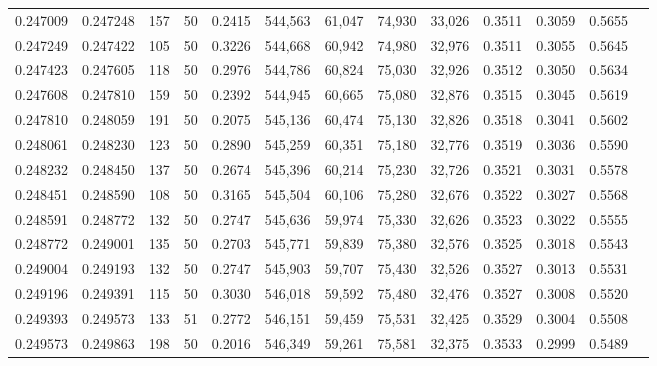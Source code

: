 \begin{tabular}{rrrrrrrrrrrrr}
0.247009 & 0.247248 &   157 &  50 &                                     0.2415 & 544,563 &  61,047 &  74,930 &  33,026 & 0.3511 & 0.3059 & 0.5655 \\
0.247249 & 0.247422 &   105 &  50 &                                     0.3226 & 544,668 &  60,942 &  74,980 &  32,976 & 0.3511 & 0.3055 & 0.5645 \\
0.247423 & 0.247605 &   118 &  50 &                                     0.2976 & 544,786 &  60,824 &  75,030 &  32,926 & 0.3512 & 0.3050 & 0.5634 \\
0.247608 & 0.247810 &   159 &  50 &                                     0.2392 & 544,945 &  60,665 &  75,080 &  32,876 & 0.3515 & 0.3045 & 0.5619 \\
0.247810 & 0.248059 &   191 &  50 &                                     0.2075 & 545,136 &  60,474 &  75,130 &  32,826 & 0.3518 & 0.3041 & 0.5602 \\
0.248061 & 0.248230 &   123 &  50 &                                     0.2890 & 545,259 &  60,351 &  75,180 &  32,776 & 0.3519 & 0.3036 & 0.5590 \\
0.248232 & 0.248450 &   137 &  50 &                                     0.2674 & 545,396 &  60,214 &  75,230 &  32,726 & 0.3521 & 0.3031 & 0.5578 \\
0.248451 & 0.248590 &   108 &  50 &                                     0.3165 & 545,504 &  60,106 &  75,280 &  32,676 & 0.3522 & 0.3027 & 0.5568 \\
0.248591 & 0.248772 &   132 &  50 &                                     0.2747 & 545,636 &  59,974 &  75,330 &  32,626 & 0.3523 & 0.3022 & 0.5555 \\
0.248772 & 0.249001 &   135 &  50 &                                     0.2703 & 545,771 &  59,839 &  75,380 &  32,576 & 0.3525 & 0.3018 & 0.5543 \\
0.249004 & 0.249193 &   132 &  50 &                                     0.2747 & 545,903 &  59,707 &  75,430 &  32,526 & 0.3527 & 0.3013 & 0.5531 \\
0.249196 & 0.249391 &   115 &  50 &                                     0.3030 & 546,018 &  59,592 &  75,480 &  32,476 & 0.3527 & 0.3008 & 0.5520 \\
0.249393 & 0.249573 &   133 &  51 &                                     0.2772 & 546,151 &  59,459 &  75,531 &  32,425 & 0.3529 & 0.3004 & 0.5508 \\
0.249573 & 0.249863 &   198 &  50 &                                     0.2016 & 546,349 &  59,261 &  75,581 &  32,375 & 0.3533 & 0.2999 & 0.5489 \\

\end{tabular}
